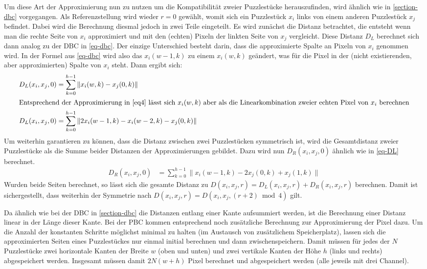 \documentclass{whswinvcbook}
\begin{document}
Um diese Art der Approximierung nun zu nutzen um die Kompatibilität zweier Puzzlestücke herauszufinden, wird ähnlich wie in \ref{section-dbc} vorgegangen. Als Referenzstellung wird wieder $r=0$ gewählt, womit sich ein Puzzlestück $x_i$ links von einem anderen Puzzlestück $x_j$ befindet. Dabei wird die Berechnung diesmal jedoch in zwei Teile eingeteilt. Es wird zunächst die Distanz betrachtet, die entsteht wenn man die rechte Seite von $x_i$ approximiert und mit den (echten) Pixeln der linkten Seite von $x_j$ vergleicht. Diese Distanz $D_L$ berechnet sich dann analog zu der DBC in \ref{eq-dbc}. Der einzige Unterschied besteht darin, dass die approximierte Spalte an Pixeln von $x_i$ genommen wird. In der Formel aus \ref{eq-dbc} wird also das $x_i(w-1,k)$ zu einem $x_i(w,k)$ geändert, was für die Pixel in der (nicht existierenden, aber approximierten) Spalte von $x_i$ steht. Dann ergibt sich:
\begin{align}\label{eq-DL}
    D_L(x_i,x_j,0)&=\sum_{k=0}^{h-1}\|x_i(w,k)-x_j(0,k)\| \nonumber \\
\shortintertext{Entsprechend der Approximierung in \ref{eq4} lässt sich $x_i(w,k)$ aber als die Linearkombination zweier echten Pixel von $x_i$ berechnen}
    D_L(x_i,x_j,0)&=\sum_{k=0}^{h-1}\|2x_i(w-1,k)-x_i(w-2,k)-x_j(0,k)\|
\end{align}
Um weiterhin garantieren zu können, dass die Distanz zwischen zwei Puzzlestücken symmetrisch ist, wird die Gesamtdistanz zweier Puzzlestücke als die Summe beider Distanzen der Approximierungen gebildet. Dazu wird nun $D_R(x_i,x_j,0)$ ähnlich wie in \ref{eq-DL} berechnet.
\begin{align}\label{eq-DR}
    D_R(x_i,x_j,0)&=\sum_{k=0}^{h-1}\|x_i(w-1,k)-2x_j(0,k)+x_j(1,k)\|
\end{align}
Wurden beide Seiten berechnet, so lässt sich die gesamte Distanz zu $D(x_i,x_j,r)=D_L(x_i,x_j,r)+D_R(x_i,x_j,r)$ berechnen. Damit ist sichergestellt, dass weiterhin der Symmetrie nach $D(x_i,x_j,r)=D\left(x_i,x_j,\left(r+2\right)\bmod4\right)$ gilt.

Da ähnlich wie bei der DBC in \ref{section-dbc} die Distanzen entlang einer Kante aufsummiert werden, ist die Berechnung einer Distanz linear in der Länge dieser Kante. Bei der PBC kommen entsprechend noch zusätzliche Berechnung zur Approximierung der Pixel dazu. Um die Anzahl der konstanten Schritte möglichst minimal zu halten (im Austausch von zusätzlichem Speicherplatz), lassen sich die approximierten Seiten eines Puzzlestückes nur einmal initial berechnen und dann zwischenspeichern. Damit müssen für jedes der $N$ Puzzlestücke zwei horizontale Kanten der Breite $w$ (oben und unten) und zwei vertikale Kanten der Höhe $h$ (links und rechts) abgespeichert werden. Insgesamt müssen damit $2N(w+h)$ Pixel berechnet und abgespeichert werden (alle jeweils mit drei Channel).
\end{document}
